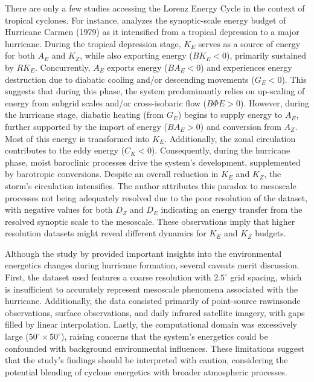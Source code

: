 There are only a few studies accessing the Lorenz Energy Cycle in the context of tropical cyclones. For instance, \citet{brennan1980zonal} analyzes the synoptic-scale energy budget of Hurricane Carmen (1979) as it intensified from a tropical depression to a major hurricane. During the tropical depression stage, \(K_E\) serves as a source of energy for both \(A_E\) and \(K_Z\), while also exporting energy (\(BK_E < 0\)), primarily sustained by \(RK_E\). Concurrently, \(A_E\) exports energy (\(BA_E < 0\)) and experiences energy destruction due to diabatic cooling and/or descending movements (\(G_E < 0\)). This suggests that during this phase, the system predominantly relies on up-scaling of energy from subgrid scales and/or cross-isobaric flow (\(B\Phi E > 0\)). However, during the hurricane stage, diabatic heating (from \(G_E\)) begins to supply energy to \(A_E\), further supported by the import of energy (\(BA_E > 0\)) and conversion from \(A_Z\). Most of this energy is transformed into \(K_E\). Additionally, the zonal circulation contributes to the eddy energy (\(C_K < 0\)). Consequently, during the hurricane phase, moist baroclinic processes drive the system's development, supplemented by barotropic conversions. Despite an overall reduction in \(K_E\) and \(K_Z\), the storm's circulation intensifies. The author attributes this paradox to mesoscale processes not being adequately resolved due to the poor resolution of the dataset, with negative values for both \(D_Z\) and \(D_E\) indicating an energy transfer from the resolved synoptic scale to the mesoscale. These observations imply that higher resolution datasets might reveal different dynamics for \(K_E\) and \(K_Z\) budgets.

Although the study by \citet{brennan1980zonal} provided important insights into the environmental energetics changes during hurricane formation, several caveats merit discussion. First, the dataset used features a coarse resolution with \(2.5^\circ\) grid spacing, which is insufficient to accurately represent mesoscale phenomena associated with the hurricane. Additionally, the data consisted primarily of point-source rawinsonde observations, surface observations, and daily infrared satellite imagery, with gaps filled by linear interpolation. Lastly, the computational domain was excessively large (\(50^\circ \times 50^\circ\)), raising concerns that the system's energetics could be confounded with background environmental influences. These limitations suggest that the study's findings should be interpreted with caution, considering the potential blending of cyclone energetics with broader atmospheric processes.

